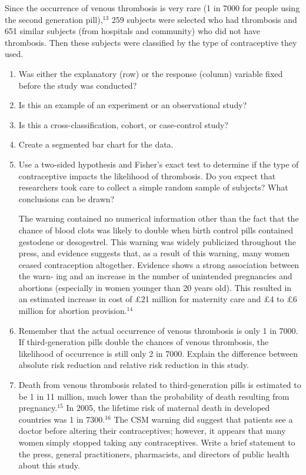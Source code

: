 \documentclass[
]{book}
\begin{document}
\begin{enumerate}
Since the occurrence of venous thrombosis is very rare (1 in 7000 for people using the second
generation pill),$^{13}$ 259 subjects were selected who had thrombosis and 651 similar subjects (from
hospitals and community) who did not have thrombosis. Then these subjects were classified by the
type of contraceptive they used.

  \begin{enumerate}
    \item Was either the explanatory (row) or the response (column) variable fixed before the study was conducted?
    \item Is this an example of an experiment or an observational study?
    \item Is this a cross-classification, cohort, or case-control study?
    \item Create a segmented bar chart for the data.
    \item Use a two-sided hypothesis and Fisher’s exact test to determine if the type of contraceptive impacts the likelihood of thrombosis. Do you expect that researchers took care to collect a simple random sample of subjects? What conclusions can be drawn?
    
    The warning contained no numerical information other than the fact that the chance of blood clots
was likely to double when birth control pills contained gestodene or desogestrel. This warning was
widely publicized throughout the press, and evidence suggests that, as a result of this warning, many
women ceased contraception altogether. Evidence shows a strong association between the warn-
ing and an increase in the number of unintended pregnancies and abortions (especially in women
younger than 20 years old). This resulted in an estimated increase in cost of £21 million for maternity
care and £4 to £6 million for abortion provision.$^{14}$
    \item Remember that the actual occurrence of venous thrombosis is only 1 in 7000. If third-generation pills double the chances of venous thrombosis, the likelihood of occurrence is still only 2 in 7000. Explain the difference between absolute risk reduction and relative risk reduction in this study.
    \item Death from venous thrombosis related to third-generation pills is estimated to be 1 in 11 million, much lower than the probability of death resulting from pregnancy.$^{15}$ In 2005, the lifetime risk of maternal death in developed countries was 1 in 7300.$^{16}$ The CSM warning did suggest that patients see a doctor before altering their contraceptives; however, it appears that many women simply stopped taking any contraceptives. Write a brief statement to the press, general practitioners, pharmacists, and directors of public health about this study.
  \end{enumerate}


\end{enumerate}
\end{document}
